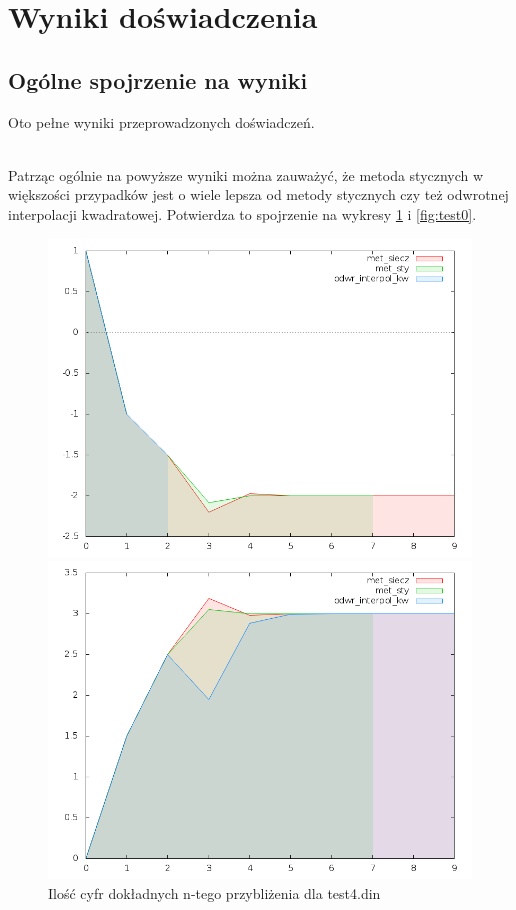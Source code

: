 \documentclass[11pt,wide]{mwart}
\begin{document}
\section{Wyniki doświadczenia}
\subsection{Ogólne spojrzenie na wyniki}
Oto pełne wyniki przeprowadzonych doświadczeń.

\\\indent Patrząc ogólnie na powyższe wyniki można zauważyć, że metoda stycznych w większości przypadków jest o wiele lepsza od metody stycznych czy też odwrotnej interpolacji kwadratowej. Potwierdza to spojrzenie na wykresy \ref{fig:test4} i \ref{fig:test0}.
\begin{figure}[ht]
  \begin{minipage}[b]{0.45\linewidth}
    \centering
    \includegraphics[width=\textwidth]{./wykresy/test4.png}
    \caption{Ilość cyfr dokładnych n-tego przybliżenia dla test4.din}
    \label{fig:test4}
  \end{minipage}
  \hspace{0.5cm}
  \begin{minipage}[b]{0.45\linewidth}
    \centering
    \includegraphics[width=\textwidth]{./wykresy/test0.png}

\end{minipage}
\end{figure}
\end{document}
